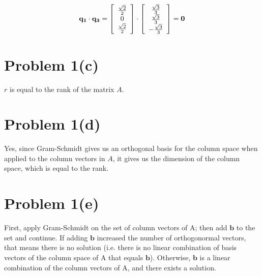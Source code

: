 \documentclass{article}
\begin{document}
$$
\mathbf{q_1} \cdot \mathbf{q_3} = 
\left[ \begin{array} {*{3}c} 
    \frac{\sqrt{2}}{2} \\
    0 \\
    \frac{\sqrt{2}}{2} \\
\end{array}\right] 
\cdot 
\left[ \begin{array} {*{3}c} 
    \frac{\sqrt{3}}{3} \\
    \frac{\sqrt{3}}{3} \\
    - \frac{\sqrt{3}}{3} \\
\end{array}\right]
= \mathbf{0}
$$

\section*{Problem 1(c)}

$r$ is equal to the rank of the matrix $A$.

\section*{Problem 1(d)}

Yes, since Gram-Schmidt gives us an orthogonal basis for the column space when applied to the column vectors in $A$, it gives us the dimension of the column space, which is equal to the rank.

\section*{Problem 1(e)}

First, apply Gram-Schmidt on the set of column vectors of A; then add $\mathbf{b}$ to the set and continue. If adding $\mathbf{b}$ increased the number of orthogonormal vectors, that means there is no solution (i.e. there is no linear combination of basis vectors of the column space of A that equals $\mathbf{b}$). Otherwise, $\mathbf{b}$ is a linear combination of the column vectors of A, and there exists a solution.

\end{document}
